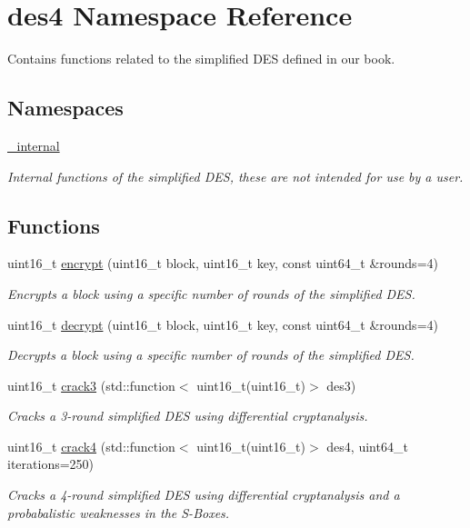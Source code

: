 \hypertarget{namespacedes4}{}\section{des4 Namespace Reference}
\label{namespacedes4}


Contains functions related to the simplified D\+ES defined in our book.  


\subsection*{Namespaces}
\begin{DoxyCompactItemize}
\item 
 \hyperlink{namespacedes4_1_1__internal}{\+\_\+internal}
\begin{DoxyCompactList}\small\item\em Internal functions of the simplified D\+ES, these are not intended for use by a user. \end{DoxyCompactList}\end{DoxyCompactItemize}
\subsection*{Functions}
\begin{DoxyCompactItemize}
\item 
uint16\+\_\+t \hyperlink{namespacedes4_a6c685705f99e1a32a7867c233aae061f}{encrypt} (uint16\+\_\+t block, uint16\+\_\+t key, const uint64\+\_\+t \&rounds=4)
\begin{DoxyCompactList}\small\item\em Encrypts a block using a specific number of rounds of the simplified D\+ES. \end{DoxyCompactList}\item 
uint16\+\_\+t \hyperlink{namespacedes4_a63b8ec1214e2e4d8898b51452d9244d6}{decrypt} (uint16\+\_\+t block, uint16\+\_\+t key, const uint64\+\_\+t \&rounds=4)
\begin{DoxyCompactList}\small\item\em Decrypts a block using a specific number of rounds of the simplified D\+ES. \end{DoxyCompactList}\item 
uint16\+\_\+t \hyperlink{namespacedes4_a74228bee8ad5bfd25aa9ee71a2925b96}{crack3} (std\+::function$<$ uint16\+\_\+t(uint16\+\_\+t)$>$ des3)
\begin{DoxyCompactList}\small\item\em Cracks a 3-\/round simplified D\+ES using differential cryptanalysis. \end{DoxyCompactList}\item 
uint16\+\_\+t \hyperlink{namespacedes4_a86feaa54b71fc0499b6b173be65be458}{crack4} (std\+::function$<$ uint16\+\_\+t(uint16\+\_\+t)$>$ des4, uint64\+\_\+t iterations=250)
\begin{DoxyCompactList}\small\item\em Cracks a 4-\/round simplified D\+ES using differential cryptanalysis and a probabalistic weaknesses in the S-\/\+Boxes. \end{DoxyCompactList}\end{DoxyCompactItemize}


